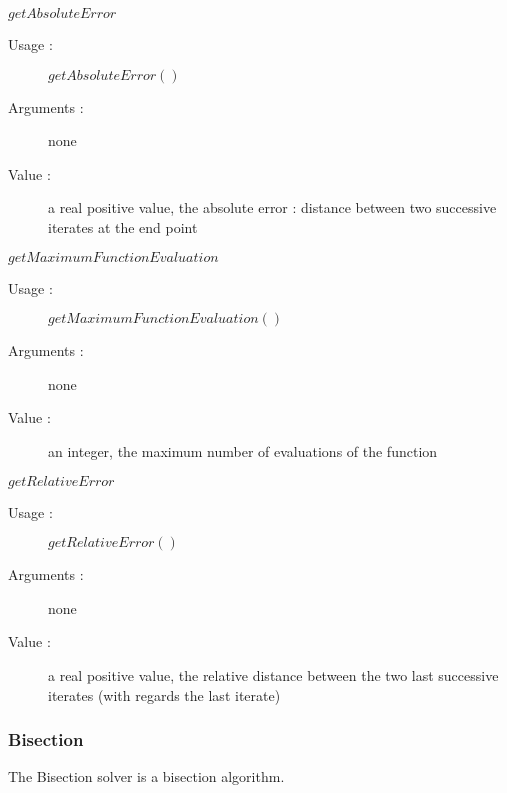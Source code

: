 \begin{description}
\begin{description}
  \item $getAbsoluteError$
    \begin{description}
    \item[Usage :] $getAbsoluteError()$
    \item[Arguments :] none
    \item[Value :] a real positive value, the absolute error : distance between two successive iterates at the end point
    \end{description}
    \bigskip
  \item $getMaximumFunctionEvaluation$
    \begin{description}
    \item[Usage :] $getMaximumFunctionEvaluation()$
    \item[Arguments :] none
    \item[Value :]  an integer, the maximum number of evaluations of the function
    \end{description}
    \bigskip
  \item $getRelativeError$
    \begin{description}
    \item[Usage :] $getRelativeError()$
    \item[Arguments :] none
    \item[Value :] a real positive value, the relative distance between the two last successive iterates (with regards the last iterate)
    \end{description}
  \end{description}

\end{description}

\newpage \subsubsection{Bisection}

The Bisection solver is a bisection algorithm.

